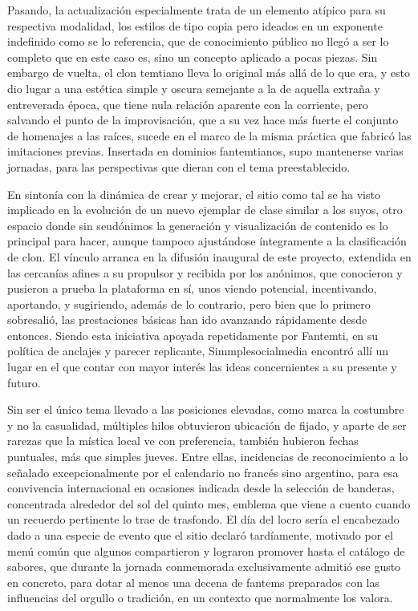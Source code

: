 \documentclass[
]{book}
\begin{document}
Pasando, la actualización especialmente trata de un elemento atípico para su respectiva modalidad, los estilos de tipo copia pero ideados en un exponente indefinido como se lo referencia, que de conocimiento público no llegó a ser lo completo que en este caso es, sino un concepto aplicado a pocas piezas. Sin embargo de vuelta, el clon temtiano lleva lo original más allá de lo que era, y esto dio lugar a una estética simple y oscura semejante a la de aquella extraña y entreverada época, que tiene nula relación aparente con la corriente, pero salvando el punto de la improvisación, que a su vez hace más fuerte el conjunto de homenajes a las raíces, sucede en el marco de la misma práctica que fabricó las imitaciones previas. Insertada en dominios fantemtianos, supo mantenerse varias jornadas, para las perspectivas que dieran con el tema preestablecido.

En sintonía con la dinámica de crear y mejorar, el sitio como tal se ha visto implicado en la evolución de un nuevo ejemplar de clase similar a los suyos, otro espacio donde sin seudónimos la generación y visualización de contenido es lo principal para hacer, aunque tampoco ajustándose íntegramente a la clasificación de clon. El vínculo arranca en la difusión inaugural de este proyecto, extendida en las cercanías afines a su propulsor y recibida por los anónimos, que conocieron y pusieron a prueba la plataforma en sí, unos viendo potencial, incentivando, aportando, y sugiriendo, además de lo contrario, pero bien que lo primero sobresalió, las prestaciones básicas han ido avanzando rápidamente desde entonces. Siendo esta iniciativa apoyada repetidamente por Fantemti, en su política de anclajes y parecer replicante, Simmplesocialmedia encontró allí un lugar en el que contar con mayor interés las ideas concernientes a su presente y futuro.

Sin ser el único tema llevado a las posiciones elevadas, como marca la costumbre y no la casualidad, múltiples hilos obtuvieron ubicación de fijado, y aparte de ser rarezas que la mística local ve con preferencia, también hubieron fechas puntuales, más que simples jueves. Entre ellas, incidencias de reconocimiento a lo señalado excepcionalmente por el calendario no francés sino argentino, para esa convivencia internacional en ocasiones indicada desde la selección de banderas, concentrada alrededor del sol del quinto mes, emblema que viene a cuento cuando un recuerdo pertinente lo trae de trasfondo. El día del locro sería el encabezado dado a una especie de evento que el sitio declaró tardíamente, motivado por el menú común que algunos compartieron y lograron promover hasta el catálogo de sabores, que durante la jornada conmemorada exclusivamente admitió ese gusto en concreto, para dotar al menos una decena de fantems preparados con las influencias del orgullo o tradición, en un contexto que normalmente los valora.
\end{document}
